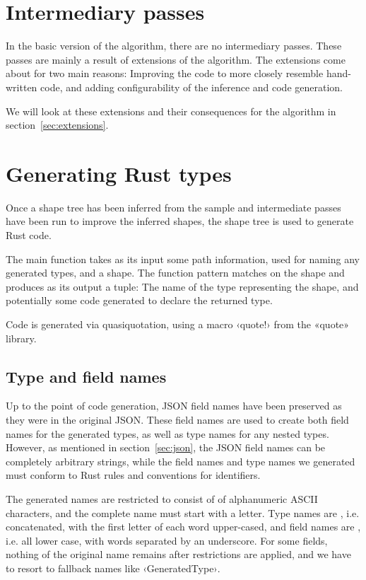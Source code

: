 \section{Intermediary passes}

In the basic version of the algorithm, there are no intermediary passes. These passes are mainly a result of extensions of the algorithm. The extensions come about for two main reasons: Improving the code to more closely resemble hand-written code, and adding configurability of the inference and code generation.

We will look at these extensions and their consequences for the algorithm in section~\ref{sec:extensions}.

\section{Generating Rust types}

Once a shape tree has been inferred from the sample and intermediate passes have been run to improve the inferred shapes, the shape tree is used to generate Rust code.

The main function takes as its input some path information, used for naming any generated types, and a shape. The function pattern matches on the shape and produces as its output a tuple: The name of the type representing the shape, and potentially some code generated to declare the returned type.

Code is generated via quasiquotation, using a macro ‹quote!› from the «quote»\cite{quote} library.


\subsection{Type and field names}

Up to the point of code generation, JSON field names have been preserved as they were in the original JSON. These field names are used to create both field names for the generated types, as well as type names for any nested types. However, as mentioned in section~\ref{sec:json}, the JSON field names can be completely arbitrary strings, while the field names and type names we generated must conform to Rust rules and conventions for identifiers.

The generated names are restricted to consist of  of alphanumeric ASCII characters, and the complete name must start with a letter. Type names are , i.e. concatenated, with the first letter of each word upper-cased, and field names are , i.e. all lower case, with words separated by an underscore. For some fields, nothing of the original name remains after restrictions are applied, and we have to resort to fallback names like ‹GeneratedType›.

